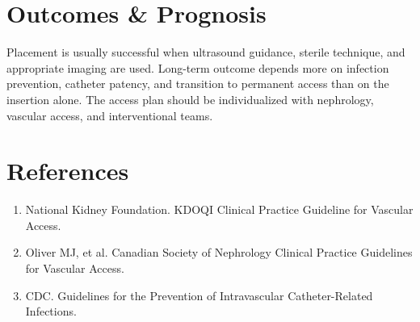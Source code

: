 \section*{Outcomes \& Prognosis}
Placement is usually successful when ultrasound guidance, sterile technique, and appropriate imaging are used. Long-term outcome depends more on infection prevention, catheter patency, and transition to permanent access than on the insertion alone. The access plan should be individualized with nephrology, vascular access, and interventional teams.

\section*{References}
\begin{enumerate}
\item National Kidney Foundation. KDOQI Clinical Practice Guideline for Vascular Access.
\item Oliver MJ, et al. Canadian Society of Nephrology Clinical Practice Guidelines for Vascular Access.
\item CDC. Guidelines for the Prevention of Intravascular Catheter-Related Infections.
\end{enumerate}

